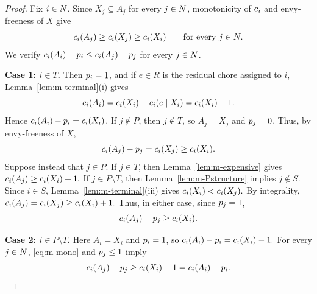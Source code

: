 \begin{proof}
Fix $i\in N$. Since $X_j\subseteq A_j$ for every $j\in N$,
monotonicity of $c_i$ and envy-freeness of $X$ give
\begin{equation}
\label{eq:m-mono}
    c_i(A_j)
    \geq c_i(X_j)
    \geq c_i(X_i)
    \qquad\text{for every }j\in N.
\end{equation}
We verify
\(
    c_i(A_i)-p_i
    \leq
    c_i(A_j)-p_j
    \)
for every $j\in N$.

\smallskip
\noindent\textbf{Case 1: $i\in T$.}
Then $p_i=1$, and if $e\in R$ is the residual chore assigned
to $i$, Lemma~\ref{lem:m-terminal}(i) gives
\[
    c_i(A_i)
    =c_i(X_i)+c_i(e\mid X_i)
    =c_i(X_i)+1.
\]
Hence $c_i(A_i)-p_i=c_i(X_i)$. If $j\notin P$, then $j\notin T$, so $A_j=X_j$ and $p_j=0$. Thus, by envy-freeness of $X$,
\[
    c_i(A_j)-p_j
    =c_i(X_j)
    \geq c_i(X_i).
\] Suppose instead that $j\in P$. If $j\in T$, then Lemma~\ref{lem:m-expensive} gives
\(
    c_i(A_j)\geq c_i(X_i)+1.
\) If $j\in P\setminus T$, then
Lemma~\ref{lem:m-Pstructure} implies $j\notin S$. Since $i\in S$, Lemma~\ref{lem:m-terminal}(iii) gives \(c_i(X_i)<c_i(X_j).\) By integrality, \(
    c_i(A_j)=c_i(X_j)\geq c_i(X_i)+1.
\) Thus, in either case, since $p_j=1$,
\[
    c_i(A_j)-p_j\geq c_i(X_i).
\]

\smallskip
\noindent\textbf{Case 2: $i\in P\setminus T$.}
Here $A_i=X_i$ and $p_i=1$, so
\(
    c_i(A_i)-p_i=c_i(X_i)-1.
\) For every $j\in N$, \eqref{eq:m-mono} and
$p_j\leq 1$ imply
\[
    c_i(A_j)-p_j
    \geq c_i(X_i)-1
    =c_i(A_i)-p_i.
\]


\end{proof}
